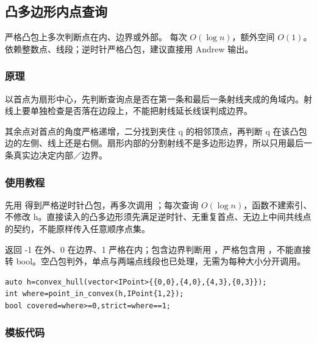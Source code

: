 \subsection{凸多边形内点查询}
\label{geo:convex-query}
\AlgorithmInfo
    {严格凸包上多次判断点在内、边界或外部。}
    {每次 $O(\log n)$，额外空间 $O(1)$。}
    {依赖整数点、线段；逆时针严格凸包，建议直接用 Andrew 输出。}
\subsubsection*{原理}

以首点为扇形中心，先判断查询点是否在第一条和最后一条射线夹成的角域内。射线上要单独检查是否落在边段上，不能把射线延长线误判成边界。

其余点对首点的角度严格递增，二分找到夹住 q 的相邻顶点，再判断 q 在该凸包边的左侧、线上还是右侧。扇形内部的分割射线不是多边形边界，所以只用最后一条真实边决定内部／边界。

\subsubsection*{使用教程}
先用  得到严格逆时针凸包，再多次调用 ；每次查询 $O(\log n)$，函数不建索引、不修改 h。直接读入的凸多边形须先满足逆时针、无重复首点、无边上中间共线点的契约，不能原样传入任意顺序点集。

返回 -1 在外、0 在边界、1 严格在内；包含边界判断用 ，严格包含用 ，不能直接转 bool。空凸包判外，单点与两端点线段也已处理，无需为每种大小分开调用。
\begin{lstlisting}[style=mtycpp,numbers=none]
auto h=convex_hull(vector<IPoint>{{0,0},{4,0},{4,3},{0,3}});
int where=point_in_convex(h,IPoint{1,2});
bool covered=where>=0,strict=where==1;
\end{lstlisting}
\subsubsection*{模板代码}
